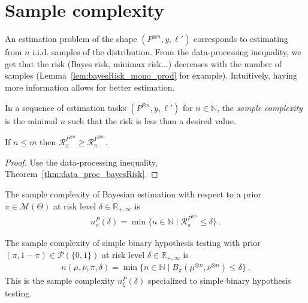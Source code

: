 \section{Sample complexity}

An estimation problem of the shape $(P^{\otimes n}, y, \ell')$ corresponds to estimating from $n$ i.i.d. samples of the distribution. From the data-processing inequality, we get that the risk (Bayes risk, minimax risk...) decreases with the number of samples (Lemma~\ref{lem:bayesRisk_mono_prod} for example).
Intuitively, having more information allows for better estimation.

In a sequence of estimation tasks $(P^{\otimes n}, y, \ell')$ for $n \in \mathbb{N}$, the \emph{sample complexity} is the minimal $n$ such that the risk is less than a desired value.

\begin{lemma}
  \label{lem:bayesRisk_mono_prod}
  If $n \le m$ then $\mathcal R_\pi^{P^{\otimes n}} \ge \mathcal R_\pi^{P^{\otimes m}}$.
\end{lemma}

\begin{proof}%
{}
Use the data-processing inequality, Theorem~\ref{thm:data_proc_bayesRisk}.
\end{proof}


\begin{definition}
  \label{def:priorSampleComplexity}
  The sample complexity of Bayesian estimation with respect to a prior $\pi \in \mathcal M(\Theta)$ at risk level $\delta \in \mathbb{R}_{+,\infty}$ is
  \begin{align*}
  n_\pi^P(\delta) = \min \{n \in \mathbb{N} \mid \mathcal R_\pi^{P^{\otimes n}} \le \delta\} \: .
  \end{align*}
\end{definition}


\begin{definition}
  \label{def:binaryPriorSampleComplexity}
  The sample complexity of simple binary hypothesis testing with prior $(\pi, 1 - \pi) \in \mathcal P(\{0, 1\})$ at risk level $\delta \in \mathbb{R}_{+, \infty}$ is
  \begin{align*}
  n(\mu, \nu, \pi, \delta) = \min\{n \in \mathbb{N} \mid B_\pi(\mu^{\otimes n}, \nu^{\otimes n}) \le \delta\} \: .
  \end{align*}
  This is the sample complexity $n_\xi^P(\delta)$ specialized to simple binary hypothesis testing.
\end{definition}


